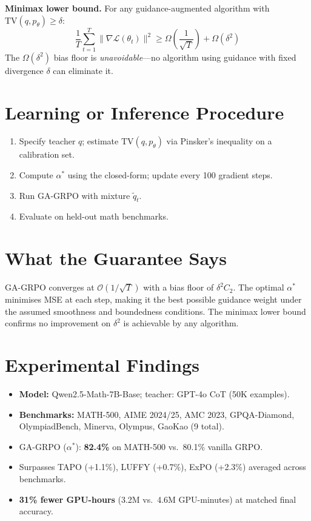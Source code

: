 \documentclass[10pt,twocolumn]{article}
\begin{document}
\textbf{Minimax lower bound.} For any guidance-augmented algorithm with
$\mathrm{TV}(q,p_\theta)\geq\delta$:
\[
\frac{1}{T}\sum_{t=1}^T\|\nabla\mathcal{L}(\theta_t)\|^2
  \geq \Omega\!\left(\frac{1}{\sqrt{T}}\right) + \Omega(\delta^2)
\]
The $\Omega(\delta^2)$ bias floor is \emph{unavoidable}---no algorithm using
guidance with fixed divergence $\delta$ can eliminate it.

\section{Learning or Inference Procedure}

\begin{enumerate}[itemsep=2pt,parsep=0pt]
  \item Specify teacher $q$; estimate $\mathrm{TV}(q,p_\theta)$ via Pinsker's
    inequality on a calibration set.
  \item Compute $\alpha^*$ using the closed-form; update every 100 gradient steps.
  \item Run GA-GRPO with mixture $\tilde{q}_t$.
  \item Evaluate on held-out math benchmarks.
\end{enumerate}

\section{What the Guarantee Says}

GA-GRPO converges at $\mathcal{O}(1/\sqrt{T})$ with a bias floor of
$\delta^2 C_2$. The optimal $\alpha^*$ minimises MSE at each step,
making it the best possible guidance weight under the assumed smoothness
and boundedness conditions. The minimax lower bound confirms no improvement
on $\delta^2$ is achievable by any algorithm.

\section{Experimental Findings}

\begin{itemize}[itemsep=2pt,parsep=0pt]
  \item \textbf{Model:} Qwen2.5-Math-7B-Base; teacher: GPT-4o CoT (50K examples).
  \item \textbf{Benchmarks:} MATH-500, AIME 2024/25, AMC 2023, GPQA-Diamond,
    OlympiadBench, Minerva, Olympus, GaoKao (9 total).
  \item GA-GRPO ($\alpha^*$): \textbf{82.4\%} on MATH-500 vs.\ 80.1\% vanilla GRPO.
  \item Surpasses TAPO (+1.1\%), LUFFY (+0.7\%), ExPO (+2.3\%) averaged across
    benchmarks.
  \item \textbf{31\% fewer GPU-hours} (3.2M vs.\ 4.6M GPU-minutes) at matched
    final accuracy.
\end{itemize}
\end{document}
